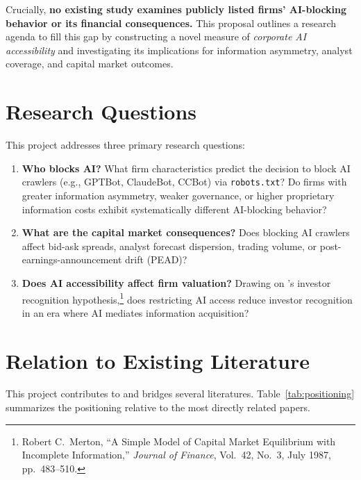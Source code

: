 \documentclass[12pt,a4paper]{article}
\begin{document}
Crucially, \textbf{no existing study examines publicly listed firms' AI-blocking behavior or its financial consequences.} This proposal outlines a research agenda to fill this gap by constructing a novel measure of \emph{corporate AI accessibility} and investigating its implications for information asymmetry, analyst coverage, and capital market outcomes.

\section{Research Questions}

This project addresses three primary research questions:

\begin{enumerate}[label=\textbf{RQ\arabic*.}]
    \item \textbf{Who blocks AI?} What firm characteristics predict the decision to block AI crawlers (e.g., GPTBot, ClaudeBot, CCBot) via \texttt{robots.txt}? Do firms with greater information asymmetry, weaker governance, or higher proprietary information costs exhibit systematically different AI-blocking behavior?

    \item \textbf{What are the capital market consequences?} Does blocking AI crawlers affect bid-ask spreads, analyst forecast dispersion, trading volume, or post-earnings-announcement drift (PEAD)?

    \item \textbf{Does AI accessibility affect firm valuation?} Drawing on \citet{Merton1987}'s investor recognition hypothesis,\footnote{Robert C.\ Merton, ``A Simple Model of Capital Market Equilibrium with Incomplete Information,'' \emph{Journal of Finance}, Vol.\ 42, No.\ 3, July 1987, pp.\ 483--510.} does restricting AI access reduce investor recognition in an era where AI mediates information acquisition?
\end{enumerate}

\section{Relation to Existing Literature}

This project contributes to and bridges several literatures. Table~\ref{tab:positioning} summarizes the positioning relative to the most directly related papers.
\end{document}
